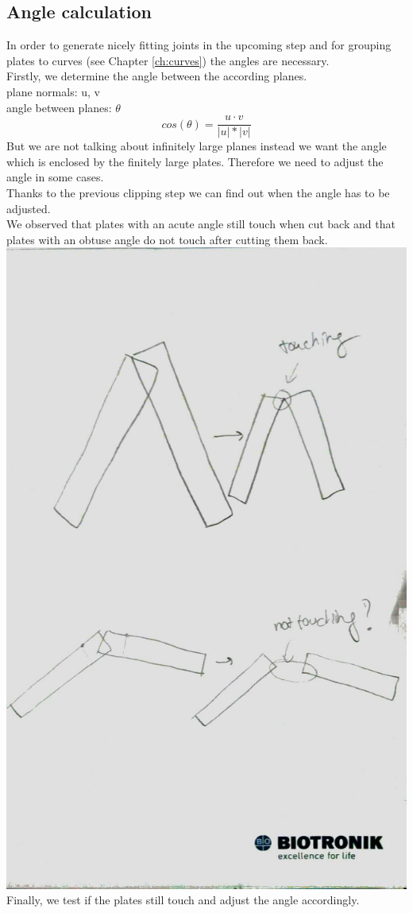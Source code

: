 \documentclass[../ClassicThesis.tex]{subfiles}
\begin{document}
\subsection{Angle calculation}\label{angleCalculation}
In order to generate nicely fitting joints in the upcoming step and for grouping plates to curves (see Chapter \ref{ch:curves}) the angles are necessary.\\
Firstly, we determine the angle between the according planes.\\
plane normals: u, v\\
angle between planes: $\theta$
$$ cos(\theta) = \frac{u \cdot v}{|u| * |v|}$$
But we are not talking about infinitely large planes instead we want the angle which is enclosed by the finitely large plates. Therefore we need to adjust the angle in some cases.\\
Thanks to the previous clipping step we can find out when the angle has to be adjusted.\\
We observed that plates with an acute angle still touch when cut back and that plates with an obtuse angle do not touch after cutting them back.\\
\includegraphics[width=.5\columnwidth]{Images/06-1-graph-TouchingOrNotAfterClipping.jpg}\\
Finally, we test if the plates still touch and adjust the angle accordingly.
\end{document}
